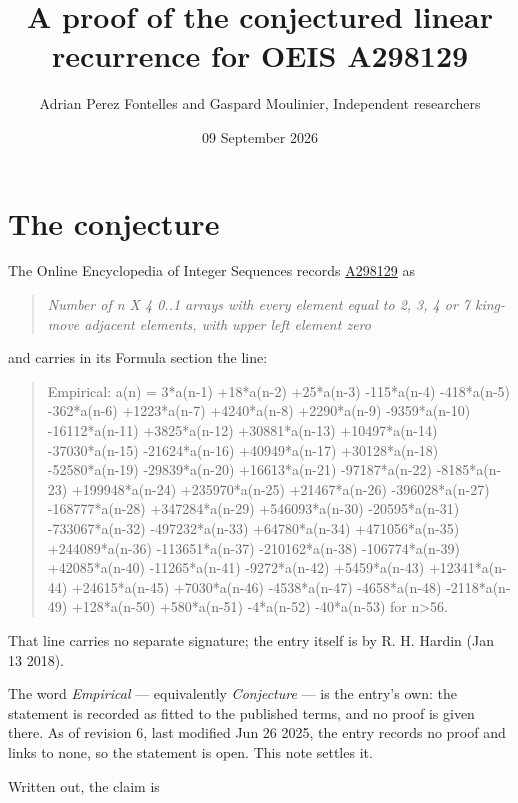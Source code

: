 \documentclass[11pt]{article}
\title{A proof of the conjectured linear recurrence for OEIS A298129}
\author{Adrian Perez Fontelles and Gaspard Moulinier, Independent researchers}
\date{09 September 2026}
\theoremstyle{definition}
\begin{document}
\maketitle
\section{The conjecture}

The Online Encyclopedia of Integer Sequences records \href{https://oeis.org/A298129}{A298129} as

\begin{quote}\itshape Number of n X 4 0..1 arrays with every element equal to 2, 3, 4 or 7 king-move adjacent elements, with upper left element zero\end{quote}

and carries in its Formula section the line:

\begin{quote}\ttfamily Empirical: a(n) = 3*a(n-1) +18*a(n-2) +25*a(n-3) -115*a(n-4) -418*a(n-5) -362*a(n-6) +1223*a(n-7) +4240*a(n-8) +2290*a(n-9) -9359*a(n-10) -16112*a(n-11) +3825*a(n-12) +30881*a(n-13) +10497*a(n-14) -37030*a(n-15) -21624*a(n-16) +40949*a(n-17) +30128*a(n-18) -52580*a(n-19) -29839*a(n-20) +16613*a(n-21) -97187*a(n-22) -8185*a(n-23) +199948*a(n-24) +235970*a(n-25) +21467*a(n-26) -396028*a(n-27) -168777*a(n-28) +347284*a(n-29) +546093*a(n-30) -20595*a(n-31) -733067*a(n-32) -497232*a(n-33) +64780*a(n-34) +471056*a(n-35) +244089*a(n-36) -113651*a(n-37) -210162*a(n-38) -106774*a(n-39) +42085*a(n-40) -11265*a(n-41) -9272*a(n-42) +5459*a(n-43) +12341*a(n-44) +24615*a(n-45) +7030*a(n-46) -4538*a(n-47) -4658*a(n-48) -2118*a(n-49) +128*a(n-50) +580*a(n-51) -4*a(n-52) -40*a(n-53) for n>56.\end{quote}

That line carries no separate signature; the entry itself is by R. H. Hardin (Jan 13 2018).

The word {\itshape Empirical} --- equivalently {\itshape Conjecture} --- is the entry's own: the statement is recorded as fitted to the published terms, and no proof is given there. As of revision 6, last modified Jun 26 2025, the entry records no proof and links to none, so the statement is open. This note settles it.

Written out, the claim is
\end{document}
